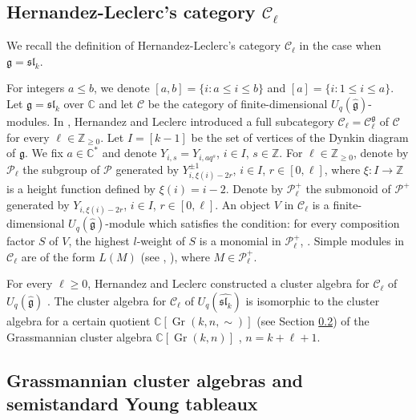 \documentclass[12pt, reqno]{amsart}
\theoremstyle{plain}
\theoremstyle{definition}
\numberwithin{equation}{section}
\newcommand{\CC}{{\mathbb {C}}}
\newcommand{\ZZ}{{\mathbb {Z}}}
\DeclareMathOperator{\Gr}{Gr}
\begin{document}
\subsection{\texorpdfstring{Hernandez-Leclerc's category $\mathcal{C}_{\ell}$}{Hernandez-Leclerc's category C\_ell}} \label{subsec:HL category and cluster algebra}

We recall the definition of Hernandez-Leclerc's category $\mathcal{C}_{\ell}$ \cite{HL10} in the case when $\mathfrak{g}=\mathfrak{sl}_k$. 

For integers $a \le b$, we denote $[a,b] = \{i: a \le i \le b\}$ and $[a] = \{i: 1 \le i \le a\}$. Let $\mathfrak{g}=\mathfrak{sl}_k$ over $\CC$ and let $\mathcal{C}$ be the category of finite-dimensional $U_q(\widehat{\mathfrak{g}})$-modules. In \cite{HL10}, Hernandez and Leclerc introduced a full subcategory $\mathcal{C}_{\ell} = \mathcal{C}_{\ell}^{\mathfrak{g}}$ of $\mathcal{C}$ for every $\ell \in \mathbb{Z}_{\geq 0}$. Let $I=[k-1]$ be the set of vertices of the Dynkin diagram of $\mathfrak{g}$. We fix $a \in \CC^*$ and denote $Y_{i,s} = Y_{i,aq^s}$, $i \in I$, $s \in \ZZ$. For $\ell \in \ZZ_{\ge 0}$, denote by $\mathcal{P}_\ell$ the subgroup of $\mathcal{P}$ generated by $Y_{i,\xi(i)-2r}^{\pm 1}$, $i \in I$, $r \in [0, \ell]$, where $\xi: I \to \ZZ$ is a height function defined by $\xi(i)=i-2$. Denote by $\mathcal{P}^+_\ell$ the submonoid of $\mathcal{P}^+$ generated by $Y_{i,\xi(i)-2r}$, $i \in I$, $r \in [0, \ell]$. An object $V$ in $\mathcal{C}_{\ell}$ is a finite-dimensional $U_q(\widehat{\mathfrak{g}})$-module which satisfies the condition: for every composition factor $S$ of $V$, the highest $l$-weight of $S$ is a monomial in $\mathcal{P}^+_\ell$, \cite{HL10}. Simple modules in $\mathcal{C}_{\ell}$ are of the form $L(M)$ (see \cite{CP94}, \cite{HL10}), where $M \in \mathcal{P}_{\ell}^+$.

For every $\ell \ge 0$, Hernandez and Leclerc constructed a cluster algebra for $\mathcal{C}_{\ell}$ of $U_q(\widehat{\mathfrak{g}})$ \cite{HL10}. The cluster algebra for $\mathcal{C}_{\ell}$ of $U_q(\widehat{\mathfrak{sl}_k})$ is isomorphic to the cluster algebra for a certain quotient $\CC[\Gr(k,n,\sim)]$ (see Section \ref{subsec:Grassmannian cluster algebras and semistandard Young tableaux}) of the Grassmannian cluster algebra $\CC[\Gr(k,n)]$ \cite{CDFL, HL10, Sco06}, $n=k+\ell+1$. 
	
\subsection{Grassmannian cluster algebras and semistandard Young tableaux}\label{subsec:Grassmannian cluster algebras and semistandard Young tableaux}
\end{document}
